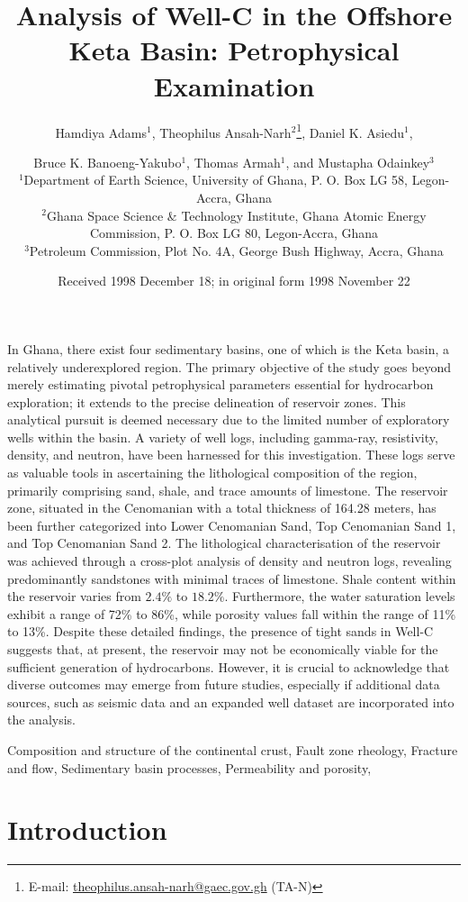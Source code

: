 \documentclass{gji}
\title[Analysis of Well-C in the Offshore Keta Basin]
  {Analysis of Well-C in the Offshore Keta Basin: Petrophysical Examination}
\author[H. Adams {\rm et~al.}]{
Hamdiya Adams$^{1}$,
Theophilus Ansah-Narh$^{2}$\thanks{E-mail: \href{theophilus.ansah-narh@gaec.gov.gh}{theophilus.ansah-narh@gaec.gov.gh} (TA-N)},
Daniel K. Asiedu$^{1}$,
\and
Bruce K. Banoeng-Yakubo$^{1}$,
Thomas Armah$^{1}$,
and Mustapha Odainkey$^{3}$
\\
$^{1}$Department of Earth Science, University of Ghana, P. O. Box LG 58, Legon-Accra, Ghana\\
$^{2}$Ghana Space Science \& Technology Institute, Ghana Atomic Energy Commission, P. O. Box LG 80, Legon-Accra, Ghana\\
$^{3}$Petroleum Commission, Plot No. 4A, George Bush Highway, Accra, Ghana
}
\date{Received 1998 December 18; in original form 1998 November 22}
\begin{document}
\label{firstpage}

\maketitle


\begin{summary}
 In Ghana, there exist four sedimentary basins, one of which is the Keta basin, a relatively underexplored region. 
The primary objective of the study goes beyond merely estimating pivotal petrophysical parameters essential for hydrocarbon exploration; it extends to the precise delineation of reservoir zones.
This analytical pursuit is deemed necessary due to the limited number of exploratory wells within the basin.
A variety of well logs, including gamma-ray, resistivity, density, and neutron, have been harnessed for this investigation.
These logs serve as valuable tools in ascertaining the lithological composition of the region, primarily comprising sand, shale, and trace amounts of limestone.
The reservoir zone, situated in the Cenomanian with a total thickness of 164.28 meters, has been further categorized into Lower Cenomanian Sand, Top Cenomanian Sand 1, and Top Cenomanian Sand 2.
The lithological characterisation of the reservoir was achieved through a cross-plot analysis of density and neutron logs, revealing predominantly sandstones with minimal traces of limestone. Shale content within the reservoir varies from $2.4\%$ to $18.2\%$. 
Furthermore, the water saturation levels exhibit a range of 72\% to 86\%, while porosity values fall within the range of 11\% to 13\%.
Despite these detailed findings, the presence of tight sands in Well-C suggests that, at present, the reservoir may not be economically viable for the sufficient generation of hydrocarbons.
However, it is crucial to acknowledge that diverse outcomes may emerge from future studies, especially if additional data sources, such as seismic data and an expanded well dataset are incorporated into the analysis.
\end{summary}

\begin{keywords}
 Composition and structure of the continental crust, Fault zone rheology, Fracture and flow, Sedimentary basin processes, Permeability and porosity,
\end{keywords}

\section{Introduction}
\end{document}
